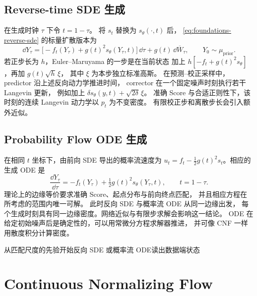 \subsection{Reverse-time SDE 生成}

在生成时钟 \(\tau\) 下令 \(t=1-\tau\)。
将 \(s_t\) 替换为 \(s_\theta(\cdot,t)\) 后，
\eqref{eq:foundations-reverse-sde} 的标量扩散版本为
\begin{equation}
  \dd Y_\tau
    =\bigl[-f_t(Y_\tau)+g(t)^2s_\theta(Y_\tau,t)\bigr]\,\dd\tau
       +g(t)\,\dd\overline W_\tau,\qquad Y_0\sim\mu_{\mathrm{prior}} .
  \label{eq:overview-score-reverse}
\end{equation}
若正步长为 \(h\)，Euler--Maruyama 的一步是在当前状态
加上 \(h[-f_t+g(t)^2s_\theta]\)，再加 \(g(t)\sqrt h\,\xi\)，
其中 \(\xi\) 为本步独立标准高斯。
在预测--校正采样中，predictor 沿上述反向动力学推进时间，
corrector 在一个固定噪声时刻执行若干 Langevin 更新，
例如加上 \(\delta s_\theta(y,t)+\sqrt{2\delta}\,\xi\)。
准确 Score 与合适正则性下，该时刻的连续 Langevin 动力学以 \(p_t\) 为不变密度。
有限校正步和离散步长会引入额外近似。

\subsection{Probability Flow ODE 生成}

在相同 \(t\) 坐标下，由前向 SDE 导出的概率流速度为
\(u_t=f_t-\tfrac12g(t)^2s_t\)。相应的生成 ODE 是
\begin{equation}
  \frac{\dd Y_\tau}{\dd\tau}
   =-f_t(Y_\tau)+\tfrac12 g(t)^2s_\theta(Y_\tau,t),\qquad t=1-\tau .
  \label{eq:overview-score-ode}
\end{equation}
理论上的边缘等价要求准确 Score、起点分布与前向终点匹配，
并且相应方程在所考虑的范围内唯一可解。
此时反向 SDE 与概率流 ODE 从同一边缘出发，
每个生成时刻具有同一边缘密度。网络近似与有限步求解会影响这一结论。
ODE 在给定初始噪声后是确定性的，可以用常微分方程求解器推进，
并可像 CNF 一样用散度积分计算密度。

  {从匹配尺度的先验开始}{反向 SDE 或概率流 ODE}{读出数据端状态}

\section{Continuous Normalizing Flow}
\label{sec:overview-cnf}

